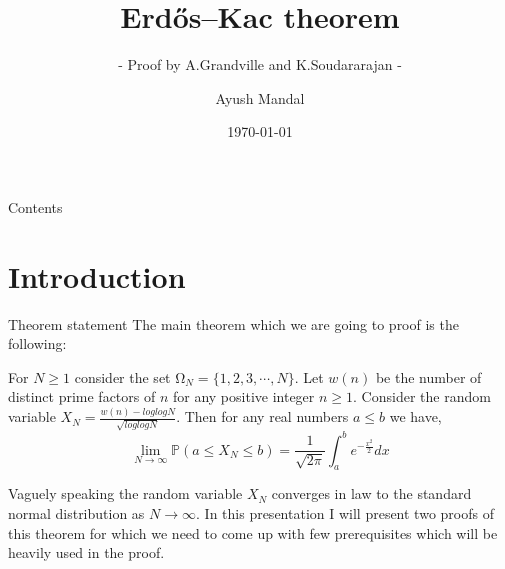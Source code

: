 \documentclass{beamer}
\title{Erdős–Kac theorem}
\subtitle{- Proof by A.Grandville and K.Soudararajan -}
\author{Ayush Mandal}
\institute{B.Math year I, Indian Statistical Institute (Bangalore)\\ \url{bmat2513@isibang.ac.in}}
\date{\today}
\numberwithin{theorem}{section}
\theoremstyle{definition}
\begin{document}
\maketitle
\begin{frame}{Contents}
\tableofcontents

    
\end{frame}
\section{Introduction}
\begin{frame}{Theorem statement}
The main theorem which we are going to proof is the following:
\begin{theorem}
    For $N\ge 1$ consider the set $\si{\ohm}_N=\{1,2,3,\cdots,N\}$. Let $w(n)$ be the number of distinct prime factors of $n$ for any positive integer $n\ge 1$. Consider the random variable $X_N=\frac{w(n)-loglogN}{\sqrt{loglogN}}$. Then for any real numbers $a\le b$ we have,
    $$\lim_{N\rightarrow \infty}\mathbb{P}(a\le X_N\le b)=\frac{1}{\sqrt{2\pi}}\int_{a}^{b}e^{-\frac{x^2}{2}}dx$$
\end{theorem}
Vaguely speaking the random variable $X_N$ converges in law to the standard normal distribution as $N\rightarrow\infty$.
In this presentation I will present two proofs of this theorem for which we need to come up with few prerequisites which will be heavily used in the proof.


\end{frame}
\end{document}
